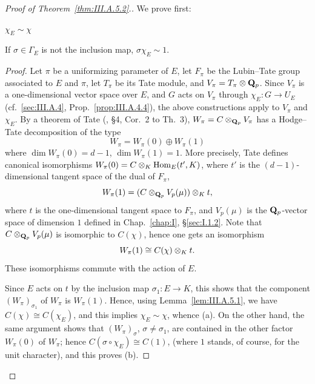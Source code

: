 \begin{proof}[Proof of Theorem~\ref{thm:III.A.5.2}.]
We prove first:

\begin{lemma}[2]\label{lem:III.A.5.2}
\begin{alist}
\item $\chi_E\sim\chi$
\item If $\sigma\in\Gamma_E$ is not the inclusion map,
$\sigma\chi_E\sim 1$.
\end{alist}
\end{lemma}

\begin{proof}
Let $\pi$ be a uniformizing parameter of $E$, let $F_\pi$ be the
Lubin--Tate group associated to $E$ and $\pi$, let $T_\pi$ be its Tate
module, and $V_\pi=T_\pi\mathbin{\otimes}\mathbf{Q}_p$.  Since $V_\pi$ is a one-dimensional
vector space over $E$, and $G$ acts on $V_\pi$ through
$\chi_E\colon G\to U_E$ (cf.~\ref{sec:III.A.4},
Prop.~\ref{prop:III.A.4.4}), the above constructions apply to $V_\pi$
and $\chi_E$.  By a theorem of Tate (\cite{tate-pdiv}, \S4, Cor.~2 to
Th.~3), $W_\pi=C\mathbin{\otimes}_{\mathbf{Q}_p}V_\pi$ has a Hodge--Tate decomposition of
the type
\[
W_\pi=W_\pi(0)\oplus W_\pi(1)
\]
where $\dim W_\pi(0)=d-1$, $\dim W_\pi(1)=1$.  More precisely, Tate
defines canonical isomorphisms $W_\pi(0)=C\mathbin{\otimes}_K\mathrm{Hom}_E(t',K)$, where
$t'$ is the $(d-1)$-dimensional tangent space of the dual of $F_\pi$,
\[
W_\pi(1)=(C\mathbin{\otimes}_{\mathbf{Q}_p}V_p(\mu))\mathbin{\otimes}_K t,
\]
where $t$ is the one-dimensional tangent space to $F_\pi$, and
$V_p(\mu)$ is the $\mathbf{Q}_p$-vector space of dimension $1$ defined in
Chap.~\ref{chap:I}, \S\ref{sec:I.1.2}.  Note that
$C\mathbin{\otimes}_{\mathbf{Q}_p}V_p(\mu)$
is isomorphic to $C(\chi)$, hence one gets an isomorphism
\[
W_\pi(1)\cong C(\chi)\mathbin{\otimes}_K t.
\]
These isomorphisms commute with the action of $E$.

Since $E$ acts on $t$ by the inclusion map $\sigma_1\colon E\to K$,
this shows that the component $(W_\pi)_{\sigma_1}$ of $W_\pi$ is
$W_\pi(1)$.  Hence, using Lemma~\ref{lem:III.A.5.1}, we have
$C(\chi)\cong C(\chi_E)$, and this implies $\chi_E\sim\chi$, whence
(a).  On the other hand, the same argument shows that
$(W_\pi)_\sigma$, $\sigma\neq\sigma_1$, are contained in the other
factor $W_\pi(0)$ of $W_\pi$; hence $C(\sigma\circ\chi_E)\cong C(1)$,
(where $1$ stands, of course, for the unit character), and this proves
(b).
\end{proof}


\end{proof}

